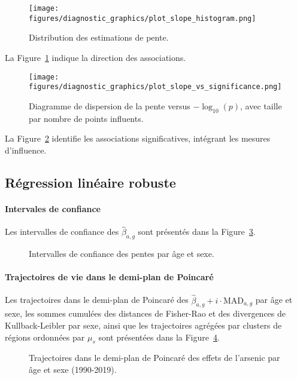 \begin{figure}[H]
	\centering
	\texttt{[image: figures/diagnostic\_graphics/plot\_slope\_histogram.png]}
	\caption{Distribution des estimations de pente.}
	\label{fig:slope_hist}
\end{figure}

La Figure~\ref{fig:slope_hist} indique la direction des associations.

\begin{figure}[H]
	\centering
	\texttt{[image: figures/diagnostic\_graphics/plot\_slope\_vs\_significance.png]}
	\caption{Diagramme de dispersion de la pente versus $-\log_{10}(p)$, avec taille par nombre de points influents.}
	\label{fig:slope_sig}
\end{figure}

La Figure~\ref{fig:slope_sig} identifie les associations significatives, intégrant les mesures d'influence.



\subsection{Régression linéaire robuste}

\paragraph{Intervales de confiance}
Les intervalles de confiance des \(\hat{\beta}_{a,g}\) sont présentés dans la Figure~\ref{fig:CI-arsenic}.
\begin{figure}[H]
	\centering
	\caption{Intervalles de confiance des pentes par âge et sexe.}
	\label{fig:CI-arsenic}
\end{figure}

\paragraph{Trajectoires de vie dans le demi-plan de Poincaré}
Les trajectoires dans le demi-plan de Poincaré des \(\hat{\beta}_{a,g} + i \cdot \mathrm{MAD}_{a,g}\) par âge et sexe, les sommes cumulées des distances de Fisher-Rao et des divergences de Kullback-Leibler par sexe, ainsi que les trajectoires agrégées par clusters de régions ordonnées par \(\mu_s\) sont présentées dans la Figure~\ref{fig:trajectoires-arsenic}.
\begin{figure}[H]
	\centering
	\caption{Trajectoires dans le demi-plan de Poincaré des effets de l'arsenic par âge et sexe (1990-2019).}
	\label{fig:trajectoires-arsenic}
\end{figure}

